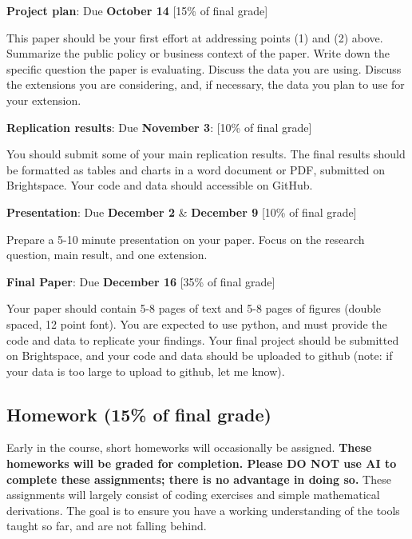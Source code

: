 \documentclass[11 pt]{article}
\begin{document}
\textbf{Project plan}: Due \textbf{October 14} [15\% of final grade] 
\begin{blist}
\item This paper should be your first effort at addressing points (1) and (2) above. 
Summarize the public policy or business context of the paper. 
Write down the specific question the paper is evaluating.
Discuss the data you are using.
Discuss the extensions you are considering, and, if necessary, the data you plan to use for your extension.
\end{blist} 

\textbf{Replication results}: Due \textbf{November 3}: [10\% of final grade]
\begin{blist}
\item You should submit some of your main replication results. The final results should be formatted as tables and charts in a word document or PDF, submitted on Brightspace. Your code and data should accessible on GitHub.
\end{blist}

\textbf{Presentation}: Due \textbf{December 2} \& \textbf{December 9} [10\% of final grade]
\begin{blist}
\item Prepare a 5-10 minute presentation on your paper. Focus on the research question, main result, and one extension. 
\end{blist}

\textbf{Final Paper}: Due \textbf{December 16} [35\% of final grade]
\begin{blist}
\item Your paper should contain 5-8 pages of text and 5-8 pages of figures (double spaced, 12 point font).
You are expected to use python, and must provide the code and data to replicate your findings. 
Your final project should be submitted on Brightspace, and your code and data should be uploaded to github (note: if your data is too large to upload to github, let me know). 
\end{blist}


\subsection*{Homework (15\% of final grade)}

Early in the course, short homeworks will occasionally be assigned. 
\textbf{These homeworks will be graded for completion. Please DO NOT use AI to complete these assignments; there is no advantage in doing so.}
These assignments will largely consist of coding exercises and simple mathematical derivations. 
The goal is to ensure you have a working understanding of the tools taught so far, and are not falling behind.
\end{document}
